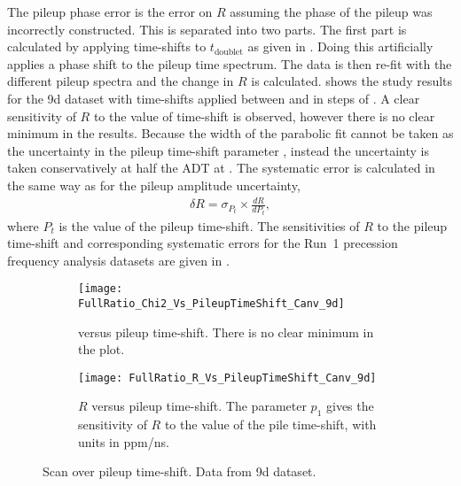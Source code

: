 The pileup phase error is the error on $R$ assuming the phase of the pileup was incorrectly constructed. This is separated into two parts. The first part is calculated by applying time-shifts to $t_{\text{doublet}}$ as given in . Doing this artificially applies a phase shift to the pileup time spectrum. The data is then re-fit with the different pileup spectra and the change in $R$ is calculated.  shows the study results for the 9d dataset with time-shifts applied between  and  in steps of . A clear sensitivity of $R$ to the value of time-shift is observed, however there is no clear minimum in the \chisq results. Because the width of the \chisq parabolic fit cannot be taken as the uncertainty in the pileup time-shift parameter , instead the uncertainty is taken conservatively at half the ADT at . The systematic error is calculated in the same way as for the pileup amplitude uncertainty,
    \begin{align}
        \delta R = \sigma_{P_{t}} \times \frac{dR}{dP_{t}},
    \end{align}
where $P_{t}$ is the value of the pileup time-shift. The sensitivities of $R$ to the pileup time-shift and corresponding systematic errors for the Run~1 precession frequency analysis datasets are given in .


\begin{figure}[]
\centering
    \begin{subfigure}[t]{0.45\textwidth}
        \centering
        \texttt{[image: FullRatio\_Chi2\_Vs\_PileupTimeShift\_Canv\_9d]}
        \caption{\chisq versus pileup time-shift. There is no clear minimum in the plot.} 
    \end{subfigure}%
    \hspace{1cm}
    \begin{subfigure}[t]{0.45\textwidth}
        \centering
        \texttt{[image: FullRatio\_R\_Vs\_PileupTimeShift\_Canv\_9d]}
        \caption{$R$ versus pileup time-shift. The parameter $p_{1}$ gives the sensitivity of $R$ to the value of the pile time-shift, with units in ppm/ns.}
    \end{subfigure}
\caption[Pileup time-shift scan]{Scan over pileup time-shift. Data from 9d dataset.}
\label{fig:PTSscan}
\end{figure}


